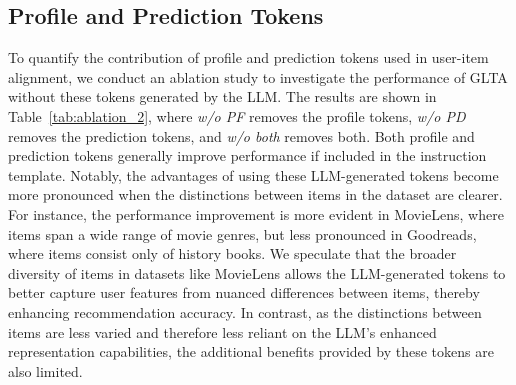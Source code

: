 \subsection{Profile and Prediction Tokens}
To quantify the contribution of profile and prediction tokens used in user-item alignment, we conduct an ablation study to investigate the performance of GLTA without these tokens generated by the LLM. The results are shown in Table~\ref{tab:ablation_2}, where \textit{w/o PF} removes the profile tokens, \textit{w/o PD} removes the prediction tokens, and \textit{w/o both} removes both. Both profile and prediction tokens generally improve performance if included in the instruction template. Notably, the advantages of using these LLM-generated tokens become more pronounced when the distinctions between items in the dataset are clearer. For instance, the performance improvement is more evident in MovieLens, where items span a wide range of movie genres, but less pronounced in Goodreads, where items consist only of history books. We speculate that the broader diversity of items in datasets like MovieLens allows the LLM-generated tokens to better capture user features from nuanced differences between items, thereby enhancing recommendation accuracy. In contrast, as the distinctions between items are less varied and therefore less reliant on the LLM's enhanced representation capabilities, the additional benefits provided by these tokens are also limited.
\begin{table}[]
\caption{Ablation study on profile and prediction tokens in GLTA.}\label{tab:ablation_2}

\end{table}

